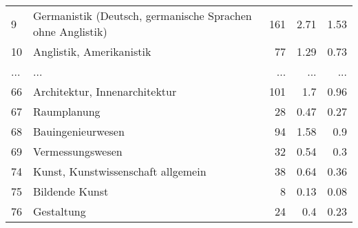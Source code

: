 \begin{longtable}{lXrrr}
        9 & \multicolumn{1}{X}{Germanistik (Deutsch, germanische Sprachen ohne Anglistik)} & %
          \num{161} &
          \num[round-mode=places,round-precision=2]{2,71} &
          \num[round-mode=places,round-precision=2]{1,53} \\
        10 & \multicolumn{1}{X}{Anglistik, Amerikanistik} & %
          \num{77} &
          \num[round-mode=places,round-precision=2]{1,29} &
          \num[round-mode=places,round-precision=2]{0,73} \\
       ... & ... & ... & ... & ... \\
        66 & \multicolumn{1}{X}{Architektur, Innenarchitektur} & %
          \num{101} &
          \num[round-mode=places,round-precision=2]{1,7} &
          \num[round-mode=places,round-precision=2]{0,96} \\

        67 & \multicolumn{1}{X}{Raumplanung} & %
          \num{28} &
          \num[round-mode=places,round-precision=2]{0,47} &
          \num[round-mode=places,round-precision=2]{0,27} \\

        68 & \multicolumn{1}{X}{Bauingenieurwesen} & %
          \num{94} &
          \num[round-mode=places,round-precision=2]{1,58} &
          \num[round-mode=places,round-precision=2]{0,9} \\

        69 & \multicolumn{1}{X}{Vermessungswesen} & %
          \num{32} &
          \num[round-mode=places,round-precision=2]{0,54} &
          \num[round-mode=places,round-precision=2]{0,3} \\

        74 & \multicolumn{1}{X}{Kunst, Kunstwissenschaft allgemein} & %
          \num{38} &
          \num[round-mode=places,round-precision=2]{0,64} &
          \num[round-mode=places,round-precision=2]{0,36} \\

        75 & \multicolumn{1}{X}{Bildende Kunst} & %
          \num{8} &
          \num[round-mode=places,round-precision=2]{0,13} &
          \num[round-mode=places,round-precision=2]{0,08} \\

        76 & \multicolumn{1}{X}{Gestaltung} & %
          \num{24} &
          \num[round-mode=places,round-precision=2]{0,4} &
          \num[round-mode=places,round-precision=2]{0,23} \\


\end{longtable}

